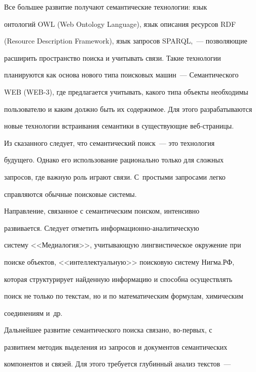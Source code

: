    Все большее развитие получают семантические технологии: язык 


онтологий OWL (Web Ontology Language), язык описания ресурсов RDF 


(Resource Description Framework), язык запросов SPARQL,~--- позволяющие 


расширить пространство поиска и учитывать связи. Такие технологии 


планируются как основа нового типа поисковых машин~--- Семантического 


WEB (WEB-3), где предлагается учитывать, какого типа объекты необходимы 


пользователю и каким должно быть их содержимое. Для этого разрабатываются 


новые технологии встраивания семантики в существующие веб-страницы. 


    


    Из сказанного следует, что семантический поиск~--- это технология 


будущего. Однако его использование рационально только для сложных 


запросов, где важную роль играют связи. С~простыми запросами легко 


справляются обычные поисковые системы. 


    


    Направление, связанное с семантическим поиском, интенсивно 


развивается. Следует отметить ин\-фор\-ма\-ци\-он\-но-ана\-ли\-ти\-че\-скую 


сис\-те\-му <<Медиалогия>>, учитывающую лингвистическое окружение при 


поиске объектов, <<интеллектуальную>> поисковую систему Нигма.РФ, 


которая структурирует найденную информацию и способна осуществлять 


поиск не только по текстам, но и по математическим формулам, химическим 


соединениям и~др. 


    


    Дальнейшее развитие семантического поиска связано, во-пер\-вых, с 


развитием методик выделения из запросов и документов семантических 


компонентов и связей. Для этого требуется глубинный анализ текстов~--- 



